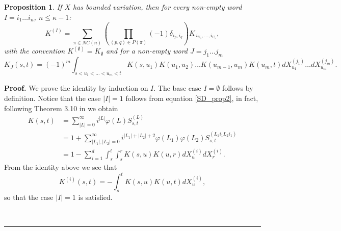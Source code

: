 \documentclass{article}%
\newtheorem{proposition}[theorem]{Proposition}
\newenvironment{proof}[1][Proof]{\noindent\textbf{#1.} }{\ \rule{0.5em}{0.5em}}
\begin{document}
\begin{proposition}\label{Gubinelli derivatives}
If $X$ has bounded variation, then for every non-empty word $I = i_1\dots i_n$, $n\leq \kappa-1$:
    \[
K^{(I)}
=
\sum_{\pi \in NC(n)}
\left(
\prod_{(p,q) \in P(\pi)} (-1) \delta_{i_p,i_q}
\right)
K_{\,i_{U_1},\ldots,i_{U_r}},
\]
with the convention $K^{(\emptyset)} = K_\emptyset$ and for a non-empty word $J = j_1 \dots j_m$
\begin{equation}\label{index_removal}
K_{J}(s,t) =   (-1)^{m} \int_{s < u_1 < \dots < u_m <t} K(s, u_1)K(u_1, u_2) \dots K(u_{m-1}, u_{m})K(u_{m}, t) dX^{(j_1)}_{u_1}\dots dX^{(j_m)}_{u_m}.
\end{equation}
\end{proposition}
\begin{proof}
We prove the identity by induction on $I$. 
The base case $I = \emptyset$ follows by definition. \newline
Notice that the case $|I|=1$ follows from equation \eqref{SD_prop2}, in fact, following Theorem 3.10 in \cite{cass2024free} we obtain
\begin{align*}
K(s,t) &= \sum_{|L|=0}^\infty i^{|L|}\varphi(L)S^{(L)}_{s,t} \\
&= 1 + \sum_{|L_1|, |L_2|=0}^\infty i^{|L_1|+|L_2| + 2} \varphi(L_1) \varphi(L_2) S^{(L_1 i_1 L_2 i_1)}_{s,t} \\
&= 1 - \sum_{i=1}^d \int_s^t \int_s^r K(s,u)K(u, r) dX^{(i)}_{u} dX^{(i)}_{r}.
\end{align*}
From the identity above we see that
\[
K^{(i)}(s,t) = -\int_s^t K(s,u)K(u, t) dX^{(i)}_u, 
\]
so that the case $|I|=1$ is satisfied.\newline


\end{proof}
\end{document}
